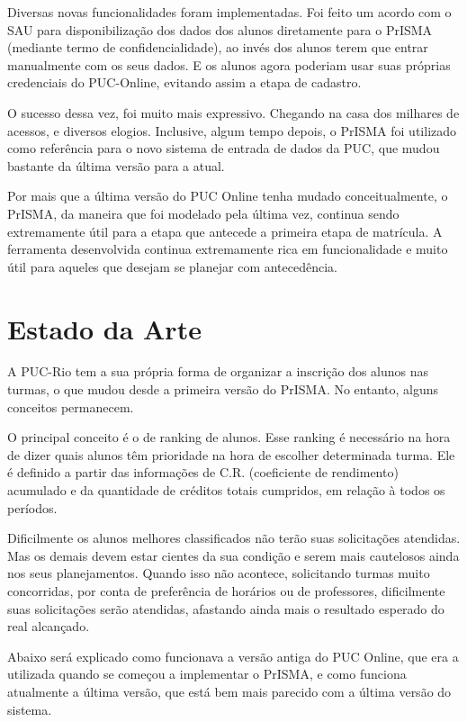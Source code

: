 \documentclass[graduacao,brazil]{ThesisPUC}
\begin{document}
Diversas novas funcionalidades foram implementadas. Foi feito um acordo com o SAU para disponibilização dos dados dos alunos diretamente para o PrISMA (mediante termo de confidencialidade), ao invés dos alunos terem que entrar manualmente com os seus dados. E os alunos agora poderiam usar suas próprias credenciais do PUC-Online, evitando assim a etapa de cadastro.

O sucesso dessa vez, foi muito mais expressivo. Chegando na casa dos milhares de acessos, e diversos elogios. Inclusive, algum tempo depois, o PrISMA foi utilizado como referência para o novo sistema de entrada de dados da PUC, que mudou bastante da última versão para a atual.

Por mais que a última versão do PUC Online tenha mudado conceitualmente, o PrISMA, da maneira que foi modelado pela última vez, continua sendo extremamente útil para a etapa que antecede a primeira etapa de matrícula. A ferramenta desenvolvida continua extremamente rica em funcionalidade e muito útil para aqueles que desejam se planejar com antecedência.


\chapter{Estado da Arte} %

A PUC-Rio tem a sua própria forma de organizar a inscrição dos alunos nas turmas, o que mudou desde a primeira versão do PrISMA. No entanto, alguns conceitos permanecem.

O principal conceito é o de ranking de alunos. Esse ranking é necessário na hora de dizer quais alunos têm prioridade na hora de escolher determinada turma. Ele é definido a partir das informações de C.R. (coeficiente de rendimento) acumulado e da quantidade de créditos totais cumpridos, em relação à todos os períodos.

Dificilmente os alunos melhores classificados não terão suas solicitações atendidas. Mas os demais devem estar cientes da sua condição e serem mais cautelosos ainda nos seus planejamentos. Quando isso não acontece, solicitando turmas muito concorridas, por conta de preferência de horários ou de professores, dificilmente suas solicitações serão atendidas, afastando ainda mais o resultado esperado do real alcançado.

Abaixo será explicado como funcionava a versão antiga do PUC Online, que era a utilizada quando se começou a implementar o PrISMA, e como funciona atualmente a última versão, que está bem mais parecido com a última versão do sistema.
\end{document}
